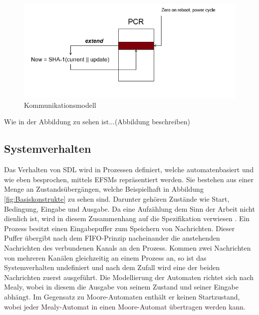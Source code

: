 \begin{figure}[ht]
	\centering
	\includegraphics[width=1\textwidth]{test.png}
	\caption{Kommunikationsmodell}
	\label{fig:KommModell}
\end{figure}

Wie in der Abbildung zu sehen ist...(Abbildung beschreiben)


\subsection{Systemverhalten}
\label{ssc:Verhalten}
Das Verhalten von \ac{SDL} wird in Prozessen definiert, welche automatenbasiert und wie eben besprochen, mittels \ac{EFSM}s repräsentiert werden. Sie bestehen aus einer Menge an Zustandsübergängen, welche Beispielhaft in Abbildung \ref{fig:Basiskonstrukte} zu sehen sind. Darunter gehören Zustände wie Start, Bedingung, Eingabe und Ausgabe. Da eine Aufzählung dem Sinn der Arbeit nicht dienlich ist, wird in diesem Zusammenhang auf die Spezifikation verwiesen \cite[44]{ITUT101_2016}.
Ein Prozess besitzt einen Eingabepuffer zum Speichern von Nachrichten. Dieser Puffer übergibt nach dem \ac{FIFO}-Prinzip nacheinander die anstehenden Nachrichten des verbundenen Kanals an den Prozess. Kommen zwei Nachrichten von mehreren Kanälen gleichzeitig an einem Prozess an, so ist das Systemverhalten undefiniert und nach dem Zufall wird eine der beiden Nachrichten zuerst ausgeführt.
Die Modellierung der Automaten richtet sich nach Mealy, wobei in diesem die Ausgabe von seinem Zustand und seiner Eingabe abhängt.
Im Gegensatz zu Moore-Automaten enthält er keinen Startzustand, wobei jeder Mealy-Automat in einen Moore-Automat übertragen werden kann.


